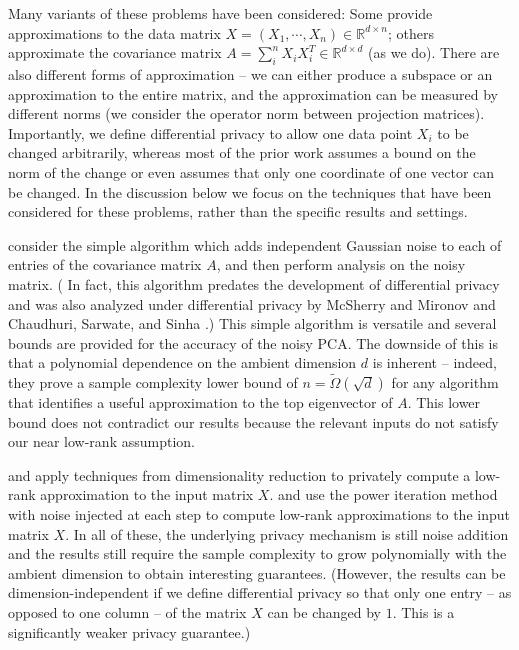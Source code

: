 Many variants of these problems have been considered: Some provide approximations to the data matrix $X = (X_1, \cdots, X_n) \in \mathbb{R}^{d \times n}$; others approximate the covariance matrix $A = \sum_i^n X_i X_i^T \in \mathbb{R}^{d \times d}$ (as we do). There are also different forms of approximation -- we can either produce a subspace or an approximation to the entire matrix, and the approximation can be measured by different norms (we consider the operator norm between projection matrices). Importantly, we define differential privacy to allow one data point $X_i$ to be changed arbitrarily, whereas most of the prior work assumes a bound on the norm of the change or even assumes that only one coordinate of one vector can be changed. In the discussion below we focus on the techniques that have been considered for these problems, rather than the specific results and settings.

 consider the simple algorithm which adds independent Gaussian noise to each of entries of the covariance matrix $A$, and then perform analysis on the noisy matrix. (%
In fact, this algorithm predates the development of differential privacy \cite{BlumDMN05} and was also analyzed under differential privacy by McSherry and Mironov \cite{McSherryM09} and Chaudhuri, Sarwate, and Sinha \cite{ChaudhuriSS12}.) %
This simple algorithm is versatile and several bounds are provided for the accuracy of the noisy PCA. The downside of this is that a polynomial dependence on the ambient dimension $d$ is inherent -- indeed, they prove a sample complexity lower bound of $n = \tilde\Omega(\sqrt{d})$ for any algorithm that identifies a useful approximation to the top eigenvector of $A$. This lower bound does not contradict our results because the relevant inputs do not satisfy our near low-rank assumption.

 and  apply techniques from dimensionality reduction to privately compute a low-rank approximation to the input matrix $X$.  and  use the power iteration method with noise injected at each step to compute low-rank approximations to the input matrix $X$. In all of these, the underlying privacy mechanism is still noise addition and the results still require the sample complexity to grow polynomially with the ambient dimension to obtain interesting guarantees. (However, the results can be dimension-independent if we define differential privacy so that only one entry -- as opposed to one column -- of the matrix $X$ can be changed by $1$. This is a significantly weaker privacy guarantee.)

